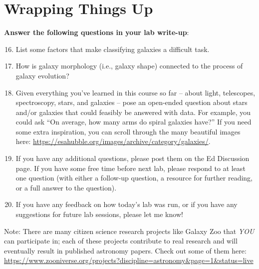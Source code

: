 \documentclass[11pt]{article}
\begin{document}
\section{Wrapping Things Up}
\textbf{Answer the following questions in your lab write-up}:
\begin{enumerate}
\setcounter{enumi}{15}
    
    \item List some factors that make classifying galaxies a difficult task.

    \item How is galaxy morphology (i.e., galaxy shape) connected to the process of galaxy evolution?

    \item Given everything you've learned in this course so far -- about light, telescopes, spectroscopy, stars, and galaxies -- pose an open-ended question about stars and/or galaxies that could feasibly be answered with data. For example, you could ask ``On average, how many arms do spiral galaxies have?'' If you need some extra inspiration, you can scroll through the many beautiful images here: \url{https://esahubble.org/images/archive/category/galaxies/}. 
    
    \item If you have any additional questions, please post them on the Ed Discussion page. If you have some free time before next lab, please respond to at least one question (with either a follow-up question, a resource for further reading, or a full answer to the question).  
    
    \item If you have any feedback on how today's lab was run, or if you have any suggestions for future lab sessions, please let me know!
\end{enumerate}

\medskip
\noindent Note: There are many citizen science research projects like Galaxy Zoo that \emph{YOU} can participate in; each of these projects contribute to real research and will eventually result in published astronomy papers. Check out some of them here: \url{https://www.zooniverse.org/projects?discipline=astronomy&page=1&status=live}
\end{document}
